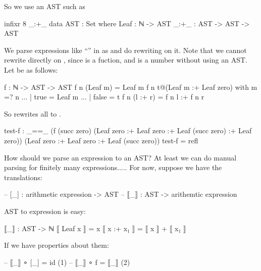 \documentclass{article}
\begin{document}
So we use an AST such as

\begin{code}
infixr 8 _:+_
data AST : Set where
  Leaf : ℕ -> AST
  _:+_ : AST -> AST -> AST
\end{code}
  
We parse expressions like ``'' in as  \AgdaOperator{\AgdaInductiveConstructor{:+}}  and do rewriting on it. Note that we cannot rewrite directly on  \AgdaOperator{\AgdaFunction{+}} , since \AgdaFunction{\AgdaUnderscore{}+\AgdaUnderscore{}} is a fuction, and  \AgdaOperator{\AgdaFunction{+}}  is a number without using an AST. Let  be as follows:

\begin{code}
f : ℕ -> AST -> AST
f n (Leaf m) = Leaf m
f n t@(Leaf m :+ Leaf zero) with m =? n
... | true = Leaf m
... | false = t
f n (l :+ r) = f n l :+ f n r
\end{code}

So   rewrites all   \AgdaOperator{\AgdaInductiveConstructor{:+}}   to  .

\begin{code}
test-f : _==_ (f (succ zero) (Leaf zero :+ Leaf zero :+ Leaf (succ zero) :+ Leaf zero))
              (Leaf zero :+ Leaf zero :+ Leaf (succ zero))
test-f = refl
\end{code}

How should we parse an expression to an AST? At least we can do manual
parsing for finitely many expressions..... For now, suppose we have
the translations:

\begin{code}
-- [_] : arithmetic expression -> AST
-- ⟦_⟧ : AST -> arithemtic expression
\end{code}

AST to expression is easy:

\begin{code}
⟦_⟧ : AST -> ℕ
⟦ Leaf x ⟧ = x
⟦ x :+ x₁ ⟧ = ⟦ x ⟧ + ⟦ x₁ ⟧
\end{code}

If we have properties about them:

\begin{code}
-- ⟦_⟧ ∘ [_] = id     (1)
-- ⟦_⟧ ∘ f = ⟦_⟧      (2)
\end{code}
\end{document}
